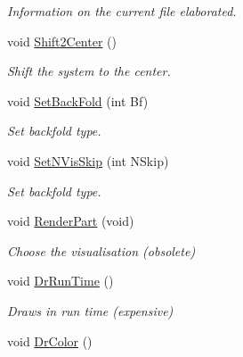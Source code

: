 \begin{DoxyCompactItemize}
\begin{DoxyCompactList}\small\item\em \-Information on the current file elaborated. \end{DoxyCompactList}\item 
\hypertarget{classElPoly_a2d5b51a7f120a4104f6e5070ca6c55f5}{void \hyperlink{classElPoly_a2d5b51a7f120a4104f6e5070ca6c55f5}{\-Shift2\-Center} ()}\label{classElPoly_a2d5b51a7f120a4104f6e5070ca6c55f5}

\begin{DoxyCompactList}\small\item\em \-Shift the system to the center. \end{DoxyCompactList}\item 
\hypertarget{classElPoly_adf3c4c944496227c17ceebc8d42d5ea5}{void \hyperlink{classElPoly_adf3c4c944496227c17ceebc8d42d5ea5}{\-Set\-Back\-Fold} (int \-Bf)}\label{classElPoly_adf3c4c944496227c17ceebc8d42d5ea5}

\begin{DoxyCompactList}\small\item\em \-Set backfold type. \end{DoxyCompactList}\item 
\hypertarget{classElPoly_a0312cac4bd3e684fef174d0147607a1c}{void \hyperlink{classElPoly_a0312cac4bd3e684fef174d0147607a1c}{\-Set\-N\-Vis\-Skip} (int \-N\-Skip)}\label{classElPoly_a0312cac4bd3e684fef174d0147607a1c}

\begin{DoxyCompactList}\small\item\em \-Set backfold type. \end{DoxyCompactList}\item 
\hypertarget{classElPoly_a6387005443a530d1a66a0833c72b23fd}{void \hyperlink{classElPoly_a6387005443a530d1a66a0833c72b23fd}{\-Render\-Part} (void)}\label{classElPoly_a6387005443a530d1a66a0833c72b23fd}

\begin{DoxyCompactList}\small\item\em \-Choose the visualisation (obsolete) \end{DoxyCompactList}\item 
\hypertarget{classElPoly_a28d17ecbad071d90ae8b571f068d865a}{void \hyperlink{classElPoly_a28d17ecbad071d90ae8b571f068d865a}{\-Dr\-Run\-Time} ()}\label{classElPoly_a28d17ecbad071d90ae8b571f068d865a}

\begin{DoxyCompactList}\small\item\em \-Draws in run time (expensive) \end{DoxyCompactList}\item 
\hypertarget{classElPoly_aef35a22a4138fad89d7329d9fd49d97e}{void \hyperlink{classElPoly_aef35a22a4138fad89d7329d9fd49d97e}{\-Dr\-Color} ()}\label{classElPoly_aef35a22a4138fad89d7329d9fd49d97e}


\end{DoxyCompactItemize}
